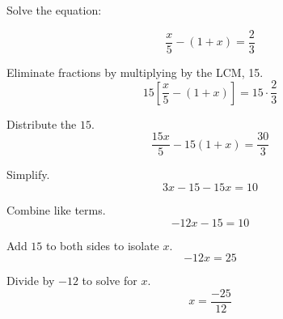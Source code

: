\documentclass[a4paper]{tufte-handout}
\begin{document}
\begin{question}
Solve the equation:

\[\frac{x}{5} - (1 + x) = \frac{2}{3}\]

\hfill{Eliminate fractions by multiplying by the LCM, 15.}
\[
15 \left[\frac{x}{5} - (1 + x)\right] = 15 \cdot \frac{2}{3}
\]

\hfill{Distribute the \(15\).}
\[
\frac{15x}{5} - 15(1 + x) = \frac{30}{3}
\]

\hfill{Simplify.}
\[
3x - 15 - 15x = 10
\]

\hfill{Combine like terms.}
\[
-12x - 15 = 10
\]

\hfill{Add \(15\) to both sides to isolate \(x\).}
\[
-12x = 25
\]

\hfill{Divide by \(-12\) to solve for \(x\).}
\[
x = \frac{-25}{12}
\]

\end{question}
\end{document}
